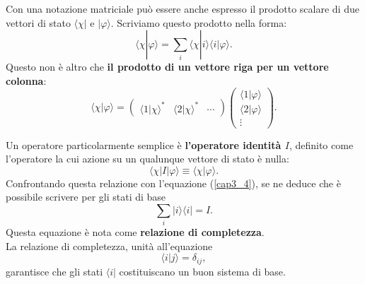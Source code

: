 \documentclass[a4paper,12pt,oneside]{book}
\begin{document}
Con una notazione matriciale può essere anche espresso il prodotto scalare di due vettori di stato $\langle \chi |$ e $ | \varphi \rangle $. Scriviamo questo prodotto nella forma:
	\begin{equation}
		\langle \chi | \varphi \rangle = \sum \limits_{i} \langle \chi | i \rangle \langle i | \varphi \rangle .
	\end{equation}
Questo non è altro che \textbf{il prodotto di un vettore riga per un vettore colonna}:
	\begin{equation}
		\boxed{
			\langle \chi | \varphi \rangle = 
			\begin{pmatrix}
			\langle 1 | \chi \rangle ^* & \langle 2 | \chi \rangle ^* & \cdots 
			\end{pmatrix}
			\begin{pmatrix}
			\langle 1 | \varphi \rangle \\ 
			\langle 2 | \varphi \rangle 
			\\ \vdots 
			\end{pmatrix} .
			}
	\end{equation}

Un operatore particolarmente semplice è \textbf{l'operatore identità $I$}, definito come l'operatore la cui azione su un qualunque vettore di stato è nulla:
	\begin{equation}
		\boxed{		
			\langle \chi | I | \varphi \rangle \equiv \langle \chi | \varphi \rangle .
			}
	\end{equation}
Confrontando questa relazione con l'equazione (\ref{cap3_4}), se ne deduce che è possibile scrivere per gli stati di base
	\begin{equation}
		\boxed{\boxed{
			\sum \limits_{i} | i \rangle \langle i | = I .
			}}
	\end{equation}
Questa equazione è nota come \textbf{relazione di completezza}.\\
La relazione di completezza, unità all'equazione
\begin{equation}
\langle i | j \rangle =\delta_{ij} ,
\end{equation}
garantisce che gli stati $\langle i | $ costituiscano un buon sistema di base.\\
\end{document}
